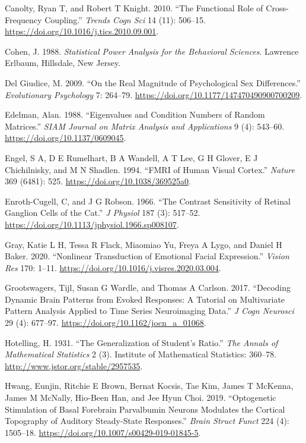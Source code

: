 \documentclass[]{article}
\begin{document}
\leavevmode\hypertarget{ref-Canolty2010}{}%
Canolty, Ryan T, and Robert T Knight. 2010. ``The Functional Role of Cross-Frequency Coupling.'' \emph{Trends Cogn Sci} 14 (11): 506--15. \url{https://doi.org/10.1016/j.tics.2010.09.001}.

\leavevmode\hypertarget{ref-Cohen1988}{}%
Cohen, J. 1988. \emph{Statistical Power Analysis for the Behavioral Sciences}. Lawrence Erlbaum, Hillsdale, New Jersey.

\leavevmode\hypertarget{ref-Giudice2009}{}%
Del Giudice, M. 2009. ``On the Real Magnitude of Psychological Sex Differences.'' \emph{Evolutionary Psychology} 7: 264--79. \url{https://doi.org/10.1177/147470490900700209}.

\leavevmode\hypertarget{ref-Edelman1988}{}%
Edelman, Alan. 1988. ``Eigenvalues and Condition Numbers of Random Matrices.'' \emph{SIAM Journal on Matrix Analysis and Applications} 9 (4): 543--60. \url{https://doi.org/10.1137/0609045}.

\leavevmode\hypertarget{ref-Engel1994}{}%
Engel, S A, D E Rumelhart, B A Wandell, A T Lee, G H Glover, E J Chichilnisky, and M N Shadlen. 1994. ``FMRI of Human Visual Cortex.'' \emph{Nature} 369 (6481): 525. \url{https://doi.org/10.1038/369525a0}.

\leavevmode\hypertarget{ref-Enroth-Cugell1966}{}%
Enroth-Cugell, C, and J G Robson. 1966. ``The Contrast Sensitivity of Retinal Ganglion Cells of the Cat.'' \emph{J Physiol} 187 (3): 517--52. \url{https://doi.org/10.1113/jphysiol.1966.sp008107}.

\leavevmode\hypertarget{ref-Gray2020}{}%
Gray, Katie L H, Tessa R Flack, Miaomiao Yu, Freya A Lygo, and Daniel H Baker. 2020. ``Nonlinear Transduction of Emotional Facial Expression.'' \emph{Vision Res} 170: 1--11. \url{https://doi.org/10.1016/j.visres.2020.03.004}.

\leavevmode\hypertarget{ref-Grootswagers2017}{}%
Grootswagers, Tijl, Susan G Wardle, and Thomas A Carlson. 2017. ``Decoding Dynamic Brain Patterns from Evoked Responses: A Tutorial on Multivariate Pattern Analysis Applied to Time Series Neuroimaging Data.'' \emph{J Cogn Neurosci} 29 (4): 677--97. \url{https://doi.org/10.1162/jocn_a_01068}.

\leavevmode\hypertarget{ref-Hotelling1931}{}%
Hotelling, H. 1931. ``The Generalization of Student's Ratio.'' \emph{The Annals of Mathematical Statistics} 2 (3). Institute of Mathematical Statistics: 360--78. \url{http://www.jstor.org/stable/2957535}.

\leavevmode\hypertarget{ref-Hwang2019}{}%
Hwang, Eunjin, Ritchie E Brown, Bernat Kocsis, Tae Kim, James T McKenna, James M McNally, Hio-Been Han, and Jee Hyun Choi. 2019. ``Optogenetic Stimulation of Basal Forebrain Parvalbumin Neurons Modulates the Cortical Topography of Auditory Steady-State Responses.'' \emph{Brain Struct Funct} 224 (4): 1505--18. \url{https://doi.org/10.1007/s00429-019-01845-5}.
\end{document}
